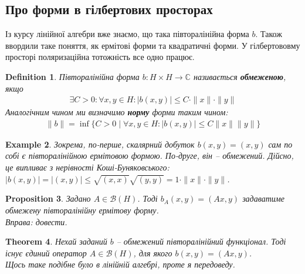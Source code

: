 \documentclass[a4paper, 10pt]{article}
\theoremstyle{theoremdd}
\newtheorem{theorem}{Theorem}[subsection]
\theoremstyle{theoremdd}
\newtheorem{definition}[theorem]{Definition}
\theoremstyle{theoremdd}
\theoremstyle{theoremdd}
\newtheorem{example}[theorem]{Example}
\theoremstyle{theoremdd}
\newtheorem{proposition}[theorem]{Proposition}
\theoremstyle{theoremdd}
\theoremstyle{theoremdd}
\theoremstyle{theoremdd}
\begin{document}
\subsection{Про форми в гілбертових просторах}
Із курсу лінійної алгебри вже знаємо, що така півторалінійна форма $b$. Також ввордили таке поняття, як ермітові форми та квадратичні форми. У гілбертововму просторі поляризаційна тотожність все одно працює.

\begin{definition}
Півторалінійна форма $b \colon H \times H \to \mathbb{C}$ називається \textbf{обмеженою}, якщо
\begin{align*}
\exists C > 0: \forall x,y \in H: |b(x,y)| \leq C \cdot \|x\| \cdot \|y\|
\end{align*}
Аналогічним чином ми визначимо \textbf{норму} форми таким чином:
\begin{align*}
\|b\| = \inf\{C > 0 \mid \forall x, y \in H: |b(x,y)| \leq C\|x\| \|y\|\}
\end{align*}
\end{definition}

\begin{example}
Зокрема, по-перше, скалярний добуток $b(x,y) = (x,y)$ сам по собі є півторалінійною ермітовою формою. По-друге, він -- обмежений. Дійсно, це випливає з нерівності Коші-Буняковського:\\
$|b(x,y)| = |(x,y)| \leq \sqrt{(x,x)} \sqrt{(y,y)} = 1 \cdot \|x\| \cdot \|y\|$.
\end{example}

\begin{proposition}
Задано $A \in \mathcal{B}(H)$. Тоді $b_A(x,y) = (Ax,y)$ задаватиме обмежену півторалінійну ермітову форму.\\
\textit{Вправа: довести.}
\end{proposition}

\begin{theorem}
Нехай заданий $b$ -- обмежений півторалінійний функціонал. Тоді існує єдиний оператор $A \in \mathcal{B}(H)$, для якого $b(x,y) = (Ax,y)$.\\
\textit{Щось таке подібне було в лінійній алгебрі, проте я передоведу.}
\end{theorem}
\end{document}
